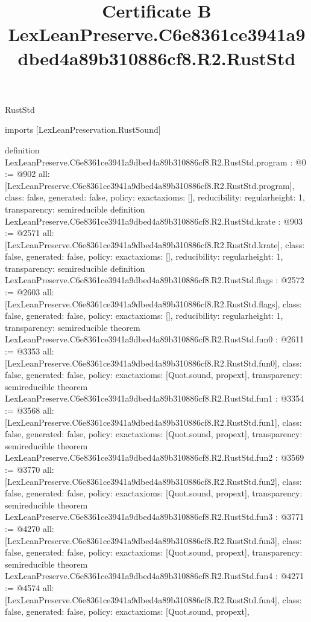 \begin{lexlean}{RustStd}
\title{Certificate B LexLeanPreserve.C6e8361ce3941a9dbed4a89b310886cf8.R2.RustStd}
\begin{coremodule}
imports [LexLeanPreservation.RustSound]

definition LexLeanPreserve.C6e8361ce3941a9dbed4a89b310886cf8.R2.RustStd.program : @0 := @902 {
  all: [LexLeanPreserve.C6e8361ce3941a9dbed4a89b310886cf8.R2.RustStd.program],
  class: false,
  generated: false,
  policy: exact{axioms: []},
  reducibility: regular{height: 1},
  transparency: semireducible
}
definition LexLeanPreserve.C6e8361ce3941a9dbed4a89b310886cf8.R2.RustStd.krate : @903 := @2571 {
  all: [LexLeanPreserve.C6e8361ce3941a9dbed4a89b310886cf8.R2.RustStd.krate],
  class: false,
  generated: false,
  policy: exact{axioms: []},
  reducibility: regular{height: 1},
  transparency: semireducible
}
definition LexLeanPreserve.C6e8361ce3941a9dbed4a89b310886cf8.R2.RustStd.flags : @2572 := @2603 {
  all: [LexLeanPreserve.C6e8361ce3941a9dbed4a89b310886cf8.R2.RustStd.flags],
  class: false,
  generated: false,
  policy: exact{axioms: []},
  reducibility: regular{height: 1},
  transparency: semireducible
}
theorem LexLeanPreserve.C6e8361ce3941a9dbed4a89b310886cf8.R2.RustStd.fun0 : @2611 := @3353 {
  all: [LexLeanPreserve.C6e8361ce3941a9dbed4a89b310886cf8.R2.RustStd.fun0],
  class: false,
  generated: false,
  policy: exact{axioms: [Quot.sound, propext]},
  transparency: semireducible
}
theorem LexLeanPreserve.C6e8361ce3941a9dbed4a89b310886cf8.R2.RustStd.fun1 : @3354 := @3568 {
  all: [LexLeanPreserve.C6e8361ce3941a9dbed4a89b310886cf8.R2.RustStd.fun1],
  class: false,
  generated: false,
  policy: exact{axioms: [Quot.sound, propext]},
  transparency: semireducible
}
theorem LexLeanPreserve.C6e8361ce3941a9dbed4a89b310886cf8.R2.RustStd.fun2 : @3569 := @3770 {
  all: [LexLeanPreserve.C6e8361ce3941a9dbed4a89b310886cf8.R2.RustStd.fun2],
  class: false,
  generated: false,
  policy: exact{axioms: [Quot.sound, propext]},
  transparency: semireducible
}
theorem LexLeanPreserve.C6e8361ce3941a9dbed4a89b310886cf8.R2.RustStd.fun3 : @3771 := @4270 {
  all: [LexLeanPreserve.C6e8361ce3941a9dbed4a89b310886cf8.R2.RustStd.fun3],
  class: false,
  generated: false,
  policy: exact{axioms: [Quot.sound, propext]},
  transparency: semireducible
}
theorem LexLeanPreserve.C6e8361ce3941a9dbed4a89b310886cf8.R2.RustStd.fun4 : @4271 := @4574 {
  all: [LexLeanPreserve.C6e8361ce3941a9dbed4a89b310886cf8.R2.RustStd.fun4],
  class: false,
  generated: false,
  policy: exact{axioms: [Quot.sound, propext]},
}
\end{coremodule}
\end{lexlean}

